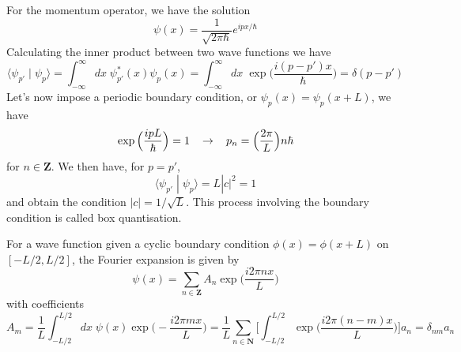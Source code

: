 \begin{ex}
For the momentum operator, we have the solution
\[\psi (x)=\dfrac{1}{\sqrt{2\pi \hbar }}e^{ipx/\hbar }\]
Calculating the inner product between two wave functions we have
\[\langle \psi_{p'}\;|\;\psi _{p}\rangle =\int ^{\infty }_{-\infty }dx\;\psi _{p'}^{\ast}(x)\psi _{p}(x)=\int ^{\infty }_{-\infty }dx\;\exp \Big(\dfrac{i(p-p')x}{\hbar }\Big)=\delta (p-p')\]
Let's now impose a periodic boundary condition, or $\psi _{p}(x)=\psi _{p}(x+L)$, we have
\[\exp \Big(\dfrac{ipL}{\hbar }\Big)=1\hspace{2ex}\rightarrow\hspace{2ex}p_{n}=\Big(\dfrac{2\pi }{L}\Big) n\hbar \]
for $n\in {\bm Z}$. We then have, for $p=p'$, 
\[\langle \psi _{p'}\;|\; \psi _{p}\rangle =L|c|^2=1\]
and obtain the condition $|c|=1/\sqrt{L}$. This process involving the boundary condition is called box quantisation.
\end{ex}
\vspace{2ex}
\begin{ex}
For a wave function given a cyclic boundary condition $\phi (x)=\phi (x+L)$ on $[-L/2,L/2]$, the Fourier expansion is given by
\[\psi (x)=\sum _{n\in {\bm Z}}A_{n}\exp \Big(\dfrac{i2\pi nx}{L}\Big)\]
with coefficients
\[A_{m}=\dfrac{1}{L}\int ^{L/2}_{-L/2}dx\;\psi (x)\exp \Big(-\dfrac{i2\pi mx}{L}\Big)=\dfrac{1}{L}\sum _{n\in {\bm N}}\Big[\int ^{L/2}_{-L/2}\exp\Big(\dfrac{i2\pi (n-m)x}{L}\Big) \Big]a_{n}=\delta _{nm}a_{n}\]

\end{ex}
\vspace{2ex}

